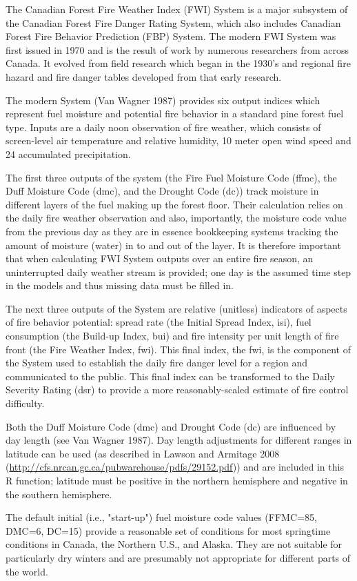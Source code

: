 \documentclass[a4paper]{book}
\begin{document}
\begin{Details}\relax
The Canadian Forest Fire Weather Index (FWI) System is a major subsystem of
the Canadian Forest Fire Danger Rating System, which also includes Canadian
Forest Fire Behavior Prediction (FBP) System. The modern FWI System was
first issued in 1970 and is the result of work by numerous researchers from
across Canada. It evolved from field research which began in the 1930's and
regional fire hazard and fire danger tables developed from that early
research.

The modern System (Van Wagner 1987) provides six output indices which
represent fuel moisture and potential fire behavior in a standard pine
forest fuel type. Inputs are a daily noon observation of fire weather, which
consists of screen-level air temperature and relative humidity, 10 meter
open wind speed and 24 accumulated precipitation.

The first three outputs of the system (the Fire Fuel Moisture Code (ffmc),
the Duff Moisture Code (dmc), and the Drought Code (dc)) track moisture in
different layers of the fuel making up the forest floor. Their calculation
relies on the daily fire weather observation and also, importantly, the
moisture code value from the previous day as they are in essence bookkeeping
systems tracking the amount of moisture (water) in to and out of the layer.
It is therefore important that when calculating FWI System outputs over an
entire fire season, an uninterrupted daily weather stream is provided; one
day is the assumed time step in the models and thus missing data must be
filled in.

The next three outputs of the System are relative (unitless) indicators of
aspects of fire behavior potential: spread rate (the Initial Spread Index,
isi), fuel consumption (the Build-up Index, bui) and fire intensity per unit
length of fire front (the Fire Weather Index, fwi).  This final index, the
fwi, is the component of the System used to establish the daily fire danger
level for a region and communicated to the public.  This final index can be
transformed to the Daily Severity Rating (dsr) to provide a more
reasonably-scaled estimate of fire control difficulty.

Both the Duff Moisture Code (dmc) and Drought Code (dc) are influenced by
day length (see Van Wagner 1987). Day length adjustments for different
ranges in latitude can be used (as described in Lawson and Armitage 2008
(\url{http://cfs.nrcan.gc.ca/pubwarehouse/pdfs/29152.pdf})) and are included
in this R function; latitude must be positive in the northern hemisphere and
negative in the southern hemisphere.

The default initial (i.e., "start-up") fuel moisture code values (FFMC=85,
DMC=6, DC=15) provide a reasonable set of conditions for most springtime
conditions in Canada, the Northern U.S., and Alaska. They are not suitable
for particularly dry winters and are presumably not appropriate for
different parts of the world.
\end{Details}
\end{document}
